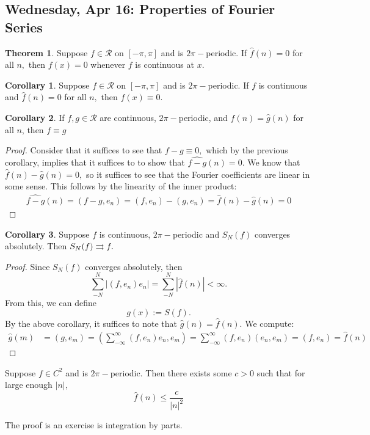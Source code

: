 \documentclass[10pt, oneside]{article}
\theoremstyle{definition}
\newtheorem{thm}{Theorem}
\newtheorem{cor}{Corollary}
\begin{document}
\subsection{Wednesday, Apr 16: Properties of Fourier Series}
\begin{thm}
    Suppose $f\in \mathcal{R}$ on $[-\pi, \pi]$ and is $2\pi-$periodic. If $\hat{f}(n) = 0$ for all $n,$ then $f(x) = 0$ whenever $f$ is continuous at $x.$
\end{thm}
\begin{cor}
    Suppose $f\in \mathcal{R}$ on $[-\pi, \pi]$ and is $2\pi-$periodic. If $f$ is continuous and $\hat{f}(n) = 0$ for all $n,$ then $f(x) \equiv 0.$
\end{cor}
\begin{cor}
    If $f,g \in \mathcal{R}$ are continuous, $2\pi-$periodic, and $\hat{f}(n  )= \hat{g}(n) $ for all $n$, then $f  \equiv g$
\end{cor}
\begin{proof}
Consider that it suffices to see that $f - g \equiv 0,$ which by the previous corollary, implies that it suffices to to show that $\widehat{f - g}(n) =0.$ We know that $\hat{f}(n ) - \hat{g}(n) = 0,$ so it suffices to see that the Fourier coefficients are linear in some sense. This follows by the linearity of the inner product:
\begin{align*}
    \widehat{f - g}(n) = (f-g, e_n) = (f, e_n) - (g, e_n) = \hat{f}(n) - \hat{g}(n) = 0
\end{align*}
\end{proof}
\begin{cor}
    Suppose $f$ is continuous, $2\pi-$periodic and $S_N(f)$ converges absolutely. Then $S_N(f)\overset{}{\rightrightarrows} f.$ 
\end{cor}
\begin{proof}
    Since $S_N(f)$ converges absolutely, then 
    \[ \sum_{-N}^N \left|(f,e_n)e_n\right| = \sum_{-N}^N |\hat{f}(n)| < \infty.\] From this, we can define 
    \[g(x):= S(f).\] By the above corollary, it suffices to note that $\hat{g}(n)= \hat{f}(n).$ We compute:
    \begin{align*}
        \hat{g}(m) &= (g,e_m) = \left(\sum_{-\infty}^\infty (f, e_n)e_n, e_m\right)= \sum_{-\infty}^\infty(f,e_n)(e_n, e_m)= (f,e_n)= \hat{f}(n)
    \end{align*}
\end{proof}
\begin{lemma}
    Suppose $f \in C^2$ and is $2\pi-$periodic. Then there exists some $c>0$ such that for large enough $|n|,$
    \[\hat{f}(n) \leq \frac{c}{|n|^2}\]
\end{lemma}
The proof is an exercise is integration by parts.
\end{document}
